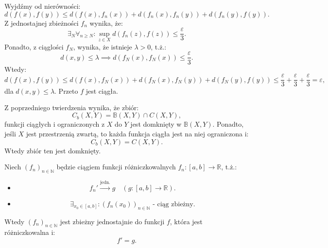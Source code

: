 \documentclass{article}
\numberwithin{defi}{section}
\numberwithin{defi}{section}
\newcommand{\R}{\mathbb{R}}
\newcommand{\N}{\mathbb{N}}
\newcommand{\B}{\mathbb{B}}
\providecommand{\eps}{\varepsilon}
\renewcommand{\geq}{\geqslant}
\renewcommand{\leq}{\leqslant}
\newcommand{\ciag}[1]{(#1_{n})_{n \in \N}}
\newcommand{\tojedn}{\xrightarrow{\text{jedn.}}}
\begin{document}
\begin{dow}{}
    Wyjdźmy od nierówności: \begin{equation}
        d(f(x), f(y)) \leq d(f(x), f_n(x)) + d(f_n(x), f_n(y)) + d(f_n(y), f(y)).
    \end{equation} Z jednostajnej zbieżności $f_n$ wynika, że: \begin{equation*}
        \exists_{N} \forall_{ n \geq N}: \sup_{z \in X} d(f_n(z), f(z)) \leq \frac{\eps}{3}.
    \end{equation*} Ponadto, z ciąglości $f_N$, wynika, że istnieje $\lambda > 0$, t.ż.: \begin{equation*}
        d(x, y) \leq \lambda \implies d(f_N(x), f_N(x)) \leq \frac{\eps}{3}.
    \end{equation*} Wtedy: \begin{equation*}
        d(f(x), f(y)) \leq d(f(x), f_N(x)) + d(f_N(x), f_N(y)) + d(f_N(y), f(y)) \leq \frac{\eps}{3} + \frac{\eps}{3} + \frac{\eps}{3} = \eps,
    \end{equation*} dla $d(x, y) \leq \lambda$. Przeto $f$ jest ciągła.
\end{dow}

\begin{obs}{}
    Z poprzedniego twierdzenia wynika, że zbiór: \begin{equation*}
        C_b(X, Y) = \B(X, Y) \cap C(X, Y),
    \end{equation*} funkcji ciągłych i ograniczonych z $X$ do $Y$ jest domknięty w $\B(X, Y)$. Ponadto, jeśli $X$ jest przestrzenią zwartą, to każda funkcja ciągła jest na niej ograniczona i: \begin{equation*}
        C_b(X, Y) = C(X, Y).
    \end{equation*} Wtedy zbiór ten jest domknięty.
\end{obs}

\begin{twier}{}
    Niech $\ciag{f}$ będzie ciągiem funkcji różniczkowalnych $f_n: [a, b] \to \R$, t.ż.: \begin{itemize}
        \item \begin{equation}
            f_n' \tojedn g \quad (g: [a, b] \to \R).
        \end{equation}
        \item \begin{equation}
            \exists_{x_0 \in [a, b]}: (f_n(x_0))_{n \in \N} \text{ - ciąg zbieżny.}
        \end{equation}
    \end{itemize}
    Wtedy $\ciag{f}$ jest zbieżny jednostajnie do funkcji $f$, która jest różniczkowalna i: \begin{equation}
        f' = g.
    \end{equation}
\end{twier}
\end{document}

